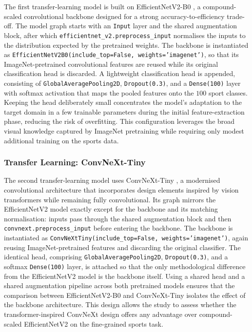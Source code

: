 The first transfer-learning model is built on EfficientNetV2-B0 \citep{tan2021efficientnetv2}, a compound-scaled convolutional backbone designed for a strong accuracy-to-efficiency trade-off.
The model graph starts with an \texttt{Input} layer and the shared augmentation block, after which \texttt{efficientnet\_v2.preprocess\_input} normalises the inputs to the distribution expected by the pretrained weights.
The backbone is instantiated as \texttt{EfficientNetV2B0(include\_top=False, weights='imagenet')}, so that its ImageNet-pretrained convolutional features are reused while its original classification head is discarded.
A lightweight classification head is appended, consisting of \texttt{GlobalAveragePooling2D}, \texttt{Dropout(0.3)}, and a \texttt{Dense(100)} layer with softmax activation that maps the pooled features onto the $100$ sport classes.
Keeping the head deliberately small concentrates the model's adaptation to the target domain in a few trainable parameters during the initial feature-extraction phase, reducing the risk of overfitting.
This configuration leverages the broad visual knowledge captured by ImageNet pretraining while requiring only modest additional training on the sports data.

\subsubsection{Transfer Learning: ConvNeXt-Tiny}
\label{subsubsec:method-convnext}

The second transfer-learning model uses ConvNeXt-Tiny \citep{liu2022convnext}, a modernised convolutional architecture that incorporates design elements inspired by vision transformers while remaining fully convolutional.
Its graph mirrors the EfficientNetV2 model exactly except for the backbone and its matching normalisation: inputs pass through the shared augmentation block and then \texttt{convnext.preprocess\_input} before entering the backbone.
The backbone is instantiated as \texttt{ConvNeXtTiny(include\_top=False, weights='imagenet')}, again reusing ImageNet-pretrained features and discarding the original classifier.
The identical head, comprising \texttt{GlobalAveragePooling2D}, \texttt{Dropout(0.3)}, and a softmax \texttt{Dense(100)} layer, is attached so that the only methodological difference from the EfficientNetV2 model is the backbone itself.
Using a shared head and a shared augmentation pipeline across both pretrained models ensures that the comparison between EfficientNetV2-B0 and ConvNeXt-Tiny isolates the effect of the backbone architecture.
This design allows the study to assess whether the transformer-inspired ConvNeXt design offers any advantage over compound-scaled EfficientNetV2 on the fine-grained sports task.


